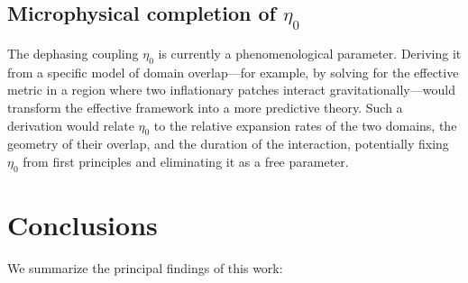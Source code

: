 \documentclass[aps,prd,twocolumn,superscriptaddress,nofootinbib]{revtex4-2}
\begin{document}
\subsection{Microphysical completion of $\eta_0$}
\label{sec:future_micro}

The dephasing coupling $\eta_0$ is currently a phenomenological
parameter. Deriving it from a specific model of domain overlap---for
example, by solving for the effective metric in a region where two
inflationary patches interact gravitationally---would transform the
effective framework into a more predictive theory. Such a derivation
would relate $\eta_0$ to the relative expansion rates of the two
domains, the geometry of their overlap, and the duration of the
interaction, potentially fixing $\eta_0$ from first principles and
eliminating it as a free parameter.


\section{Conclusions}
\label{sec:conclusions}

We summarize the principal findings of this work:
\end{document}
